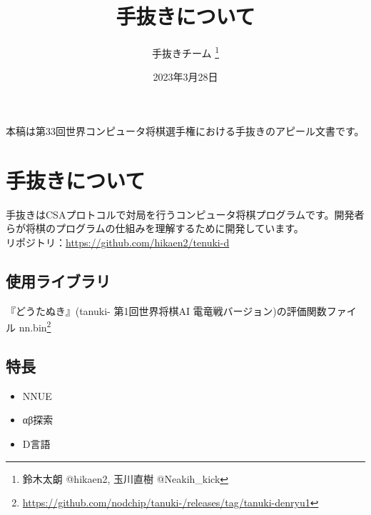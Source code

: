\documentclass[11pt,a4paper]{ltjsarticle}
\title{手抜きについて}
\author{手抜きチーム \thanks{鈴木太朗 @hikaen2, 玉川直樹 @Neakih\_kick} }
\date{2023年3月28日}
\begin{document}
\maketitle


本稿は第33回世界コンピュータ将棋選手権における手抜きのアピール文書です。


\section{手抜きについて}

手抜きはCSAプロトコルで対局を行うコンピュータ将棋プログラムです。開発者らが将棋のプログラムの仕組みを理解するために開発しています。 \\
リポジトリ：\url{https://github.com/hikaen2/tenuki-d}


\subsection{使用ライブラリ}

『どうたぬき』(tanuki- 第1回世界将棋AI 電竜戦バージョン)の評価関数ファイル nn.bin\footnote{\url{https://github.com/nodchip/tanuki-/releases/tag/tanuki-denryu1}}



\subsection{特長}

\begin{itemize}
  \item NNUE
  \item αβ探索
  \item D言語
\end{itemize}



\end{document}

